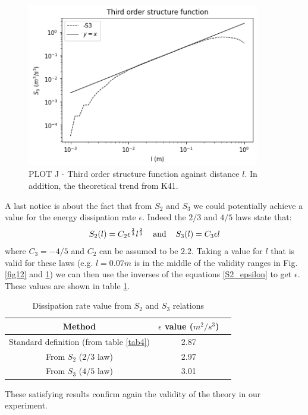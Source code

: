 \documentclass[11pt,titlepage]{article}
\begin{document}
\newpage
\begin{center}
	\begin{figure} [h]
		\centering
		\includegraphics[width = 4in]{./figures/ex1_7_2.png}
		\caption{PLOT J - Third order structure function against distance $l$. In addition, the theoretical trend from K41.}
		\label{fig13}
	\end{figure}
\end{center}

A last notice is about the fact that from $S_2$ and $S_3$ we could potentially achieve a value for the energy dissipation rate $\epsilon$. Indeed the $2/3$ and $4/5$ laws state that:
\begin{equation} \label{S2_epsilon}
	S_2(l) = C_2 \epsilon^\frac{2}{3} l^\frac{2}{3} \hspace{4mm} \text{and} \hspace{4mm}S_3(l) = C_3 \epsilon l
\end{equation}
where $C_3 = -4/5$ and $C_2$ can be assumed to be $2.2$. Taking a value for $l$ that is valid for these laws (e.g. $l=0.07m$ is in the middle of the validity ranges in Fig. \ref{fig12} and \ref{fig13}) we can then use the inverses of the equations \ref{S2_epsilon} to get $\epsilon$. These values are shown in table \ref{tab6}.

\begin{table}[h]
	\centering
	\caption{Dissipation rate value from $S_2$ and $S_3$ relations} \label{tab6}
	\begin{tabular}{ | c | c | c |}
		\hline
		Method &  $\epsilon$ value ($m^2/s^3$) \\
		\hline
		Standard definition (from table \ref{tab4}) & 2.87 \\
		\hline
		From $S_2$ ($2/3$ law) & 2.97\\
		\hline
		From $S_3$ ($4/5$ law) & 3.01\\
		\hline
	\end{tabular}
\end{table}
These satisfying results confirm again the validity of the theory in our experiment.
\newpage
\end{document}
